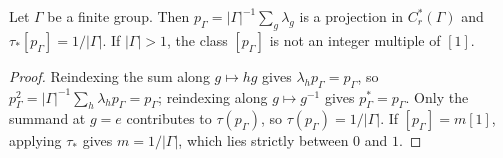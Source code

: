 \begin{proposition}\label{prop:finite-group-averaging-projection}
\leanok
Let $\Gamma$ be a finite group. Then $p_\Gamma=|\Gamma|^{-1}\sum_g\lambda_g$ is a
projection in $C_r^*(\Gamma)$ and $\tau_*[p_\Gamma]=1/|\Gamma|$. If
$|\Gamma|>1$, the class $[p_\Gamma]$ is not an integer multiple of $[1]$.
\end{proposition}
\begin{proof}
\leanok
Reindexing the sum along $g\mapsto hg$ gives $\lambda_hp_\Gamma=p_\Gamma$, so
$p_\Gamma^2=|\Gamma|^{-1}\sum_h\lambda_hp_\Gamma=p_\Gamma$; reindexing along
$g\mapsto g^{-1}$ gives $p_\Gamma^*=p_\Gamma$. Only the summand at $g=e$
contributes to $\tau(p_\Gamma)$, so $\tau(p_\Gamma)=1/|\Gamma|$. If
$[p_\Gamma]=m[1]$, applying $\tau_*$ gives $m=1/|\Gamma|$, which lies strictly
between $0$ and $1$.
\end{proof}
